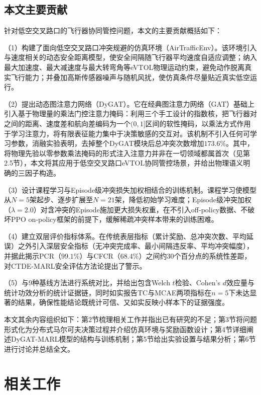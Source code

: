 \documentclass[12pt,a4paper,UTF8]{ctexart}
\begin{document}
\subsection{本文主要贡献}

针对低空交叉路口的飞行器协同管控问题，本文的主要贡献概括如下：

（1）构建了面向低空交叉路口冲突规避的仿真环境（AirTrafficEnv）。该环境引入与速度相关的动态安全距离模型，使安全间隔随飞行器平均速度自适应调整；纳入最大加速度、最大减速度与最大转弯角等eVTOL物理运动约束，避免动作脱离真实飞行能力；并叠加高斯传感器噪声与随机风扰，使仿真条件尽量贴近真实低空运行。

（2）提出动态图注意力网络（DyGAT）。它在经典图注意力网络（GAT）基础上引入基于物理量的乘法门控注意力掩码：利用三个手工设计的指数核，把飞行器对之间的距离、速度差和航向差编码为一个$(0,1]$区间的软性掩码，以乘法方式作用于学习注意力，将有限表征能力集中于决策敏感的交互对。该机制不引入任何可学习参数，消融实验表明，去掉整个DyGAT模块后总冲突次数增加$173.6\%$。其中，将物理先验以零参数乘法掩码的形式注入注意力并非在一切领域都属首次（见第2.5节），本文将其应用于低空交叉路口eVTOL协同管控场景，并给出物理语义明确的三因子构造。

（3）设计课程学习与Episode级冲突损失加权相结合的训练机制。课程学习使模型从$N=5$架起步、逐步扩展至$N=21$架，降低初始学习难度；Episode级冲突加权（$\lambda=2.0$）对含冲突的Episode施加更大损失权重，在不引入off-policy数据、不破坏PPO on-policy框架的前提下，缓解稀疏冲突样本带来的训练困难。

（4）建立双层评价指标体系。在传统表层指标（累计奖励、总冲突次数、平均延误）之外引入深层安全指标（无冲突完成率、最小间隔违反率、平均冲突幅度），并据此揭示PCR（$99.1\%$）与CFCR（$68.4\%$）之间约30个百分点的系统性差距，对CTDE-MARL安全评估方法论提出了警示。

（5）与9种基线方法进行系统对比，并给出包含Welch $t$检验、Cohen's $d$效应量与统计功效分析的统计证据链，同时如实报告TC与MCAE两项指标在$n=5$下未达显著的结果，确保性能结论既统计可信、又如实反映小样本下的证据强度。

本文其余内容组织如下：第2节梳理相关工作并指出已有研究的不足；第3节将问题形式化为分布式马尔可夫决策过程并介绍仿真环境与奖励函数设计；第4节详细阐述DyGAT-MARL模型的结构与训练机制；第5节给出实验设置与结果分析；第6节进行讨论并总结全文。

\section{相关工作}
\end{document}
